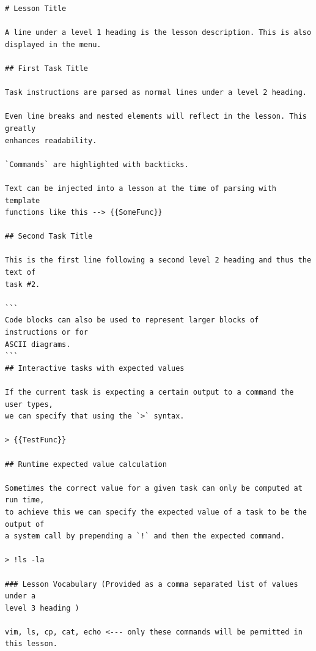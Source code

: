 \begin{lstlisting}[float=htbp, frame=single, language={}, label=lst:markdown, caption=Specification for Markdown lesson files.]
# Lesson Title

A line under a level 1 heading is the lesson description. This is also
displayed in the menu.

## First Task Title

Task instructions are parsed as normal lines under a level 2 heading.

Even line breaks and nested elements will reflect in the lesson. This greatly
enhances readability.

`Commands` are highlighted with backticks.

Text can be injected into a lesson at the time of parsing with template
functions like this --> {{SomeFunc}}

## Second Task Title

This is the first line following a second level 2 heading and thus the text of
task #2.

```
Code blocks can also be used to represent larger blocks of instructions or for
ASCII diagrams.
```
## Interactive tasks with expected values

If the current task is expecting a certain output to a command the user types,
we can specify that using the `>` syntax.

> {{TestFunc}}

## Runtime expected value calculation

Sometimes the correct value for a given task can only be computed at run time,
to achieve this we can specify the expected value of a task to be the output of
a system call by prepending a `!` and then the expected command.

> !ls -la

### Lesson Vocabulary (Provided as a comma separated list of values under a
level 3 heading )

vim, ls, cp, cat, echo <--- only these commands will be permitted in this lesson.

\end{lstlisting}




